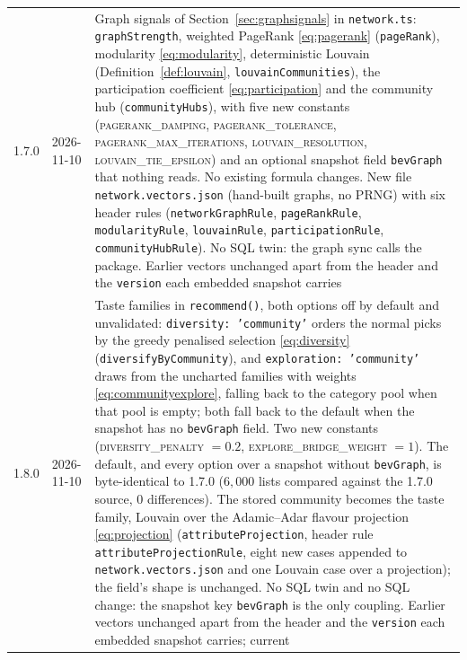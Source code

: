 \documentclass[11pt]{article}
\newcommand{\code}[1]{\texttt{#1}}
\theoremstyle{plain}
\theoremstyle{definition}
\theoremstyle{remark}
\begin{document}
\begin{center}
\begin{tabular}{@{}llp{9.5cm}@{}}
1.7.0 & 2026-11-10 & Graph signals of Section~\ref{sec:graphsignals} in \code{network.ts}: \code{graphStrength}, weighted PageRank \eqref{eq:pagerank} (\code{pageRank}), modularity \eqref{eq:modularity}, deterministic Louvain (Definition~\ref{def:louvain}, \code{louvainCommunities}), the participation coefficient \eqref{eq:participation} and the community hub (\code{communityHubs}), with five new constants (\textsc{pagerank\_damping}, \textsc{pagerank\_tolerance}, \textsc{pagerank\_max\_iterations}, \textsc{louvain\_resolution}, \textsc{louvain\_tie\_epsilon}) and an optional snapshot field \code{bevGraph} that nothing reads. No existing formula changes. New file \code{network.vectors.json} (hand-built graphs, no PRNG) with six header rules (\code{networkGraphRule}, \code{pageRankRule}, \code{modularityRule}, \code{louvainRule}, \code{participationRule}, \code{communityHubRule}). No SQL twin: the graph sync calls the package. Earlier vectors unchanged apart from the header and the \code{version} each embedded snapshot carries \\
1.8.0 & 2026-11-10 & Taste families in \code{recommend()}, both options off by default and unvalidated: \code{diversity: 'community'} orders the normal picks by the greedy penalised selection \eqref{eq:diversity} (\code{diversifyByCommunity}), and \code{exploration: 'community'} draws from the uncharted families with weights \eqref{eq:communityexplore}, falling back to the category pool when that pool is empty; both fall back to the default when the snapshot has no \code{bevGraph} field. Two new constants (\textsc{diversity\_penalty} $= 0.2$, \textsc{explore\_bridge\_weight} $= 1$). The default, and every option over a snapshot without \code{bevGraph}, is byte-identical to 1.7.0 ($6{,}000$ lists compared against the 1.7.0 source, $0$ differences). The stored community becomes the taste family, Louvain over the Adamic--Adar flavour projection \eqref{eq:projection} (\code{attributeProjection}, header rule \code{attributeProjectionRule}, eight new cases appended to \code{network.vectors.json} and one Louvain case over a projection); the field's shape is unchanged. No SQL twin and no SQL change: the snapshot key \code{bevGraph} is the only coupling. Earlier vectors unchanged apart from the header and the \code{version} each embedded snapshot carries; current \\
\bottomrule
\end{tabular}
\end{center}

\appendix
\end{document}
